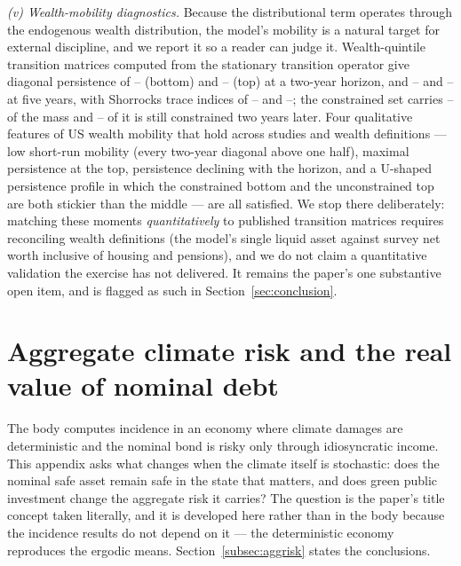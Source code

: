 \documentclass[12pt]{article}
\providecommand{\pendingnum}{\textit{--}}
\providecommand{\MobQoneTwo}{\pendingnum}\providecommand{\MobQfiveTwo}{\pendingnum}
\providecommand{\MobQoneFive}{\pendingnum}\providecommand{\MobQfiveFive}{\pendingnum}
\providecommand{\MobShTwo}{\pendingnum}\providecommand{\MobShFive}{\pendingnum}
\providecommand{\MobConMass}{\pendingnum}\providecommand{\MobConStay}{\pendingnum}
\begin{document}
\emph{(v) Wealth-mobility diagnostics.} Because the distributional term
operates through the endogenous wealth distribution, the model's mobility
is a natural target for external discipline, and we report it so a reader
can judge it. Wealth-quintile transition matrices computed from the
stationary transition operator give diagonal persistence of
$\MobQoneTwo$ (bottom) and $\MobQfiveTwo$ (top) at a two-year horizon, and
$\MobQoneFive$ and $\MobQfiveFive$ at five years, with Shorrocks trace
indices of $\MobShTwo$ and $\MobShFive$; the constrained set carries
$\MobConMass$ of the mass and $\MobConStay$ of it is still constrained two
years later. Four qualitative features of US wealth mobility that hold
across studies and wealth definitions --- low short-run mobility (every
two-year diagonal above one half), maximal persistence at the top,
persistence declining with the horizon, and a U-shaped persistence profile
in which the constrained bottom and the unconstrained top are both stickier
than the middle --- are all satisfied. We stop there deliberately: matching
these moments \emph{quantitatively} to published transition matrices
requires reconciling wealth definitions (the model's single liquid asset
against survey net worth inclusive of housing and pensions), and we do not
claim a quantitative validation the exercise has not delivered. It remains
the paper's one substantive open item, and is flagged as such in
Section~\ref{sec:conclusion}.

\section{Aggregate climate risk and the real value of nominal debt}
\label{app:aggrisk}
The body computes incidence in an economy where climate damages are
deterministic and the nominal bond is risky only through idiosyncratic
income. This appendix asks what changes when the climate itself is
stochastic: does the nominal safe asset remain safe in the state that
matters, and does green public investment change the aggregate risk it
carries? The question is the paper's title concept taken literally, and it
is developed here rather than in the body because the incidence results do
not depend on it --- the deterministic economy reproduces the ergodic means.
Section~\ref{subsec:aggrisk} states the conclusions.
\end{document}
